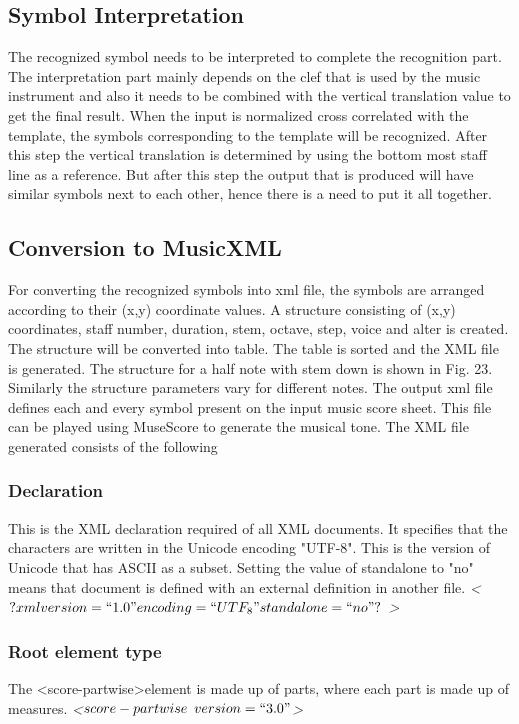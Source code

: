 \documentclass[journal]{IEEEtran}
\begin{document}
\subsection{Symbol Interpretation}
The recognized symbol needs to be interpreted to complete the recognition part. The interpretation part mainly depends on the clef that is used by the music instrument and also it needs to be combined with the vertical translation value to get the final result. When the input is normalized cross correlated with the template, the symbols corresponding to the template will be recognized. After
this step the vertical translation is determined by using the bottom most staff line as a reference. But after this step the output that is produced will have similar symbols next to each other, hence there is a need to put it all together.	



\subsection{Conversion to MusicXML}
For converting the recognized symbols into xml file, the symbols are arranged according to their (x,y) coordinate values. A structure consisting of (x,y) coordinates, staff number, duration, stem, octave, step, voice and alter is created. The structure will be converted into table. The table is sorted and the XML file is generated. The structure for a half note with stem down is shown in Fig. 23. Similarly the structure parameters vary for different notes. The output xml file defines each and every symbol present on the input music score sheet. This file can be played using MuseScore to generate the musical tone. 
The XML file generated consists of the following
\subsubsection{Declaration}

This is the XML declaration required of all XML documents. It specifies that the characters are
written in the Unicode encoding "UTF-8". This is the version of Unicode that has ASCII as a subset.
Setting the value of standalone to "no" means that document is defined with an external definition
in another file.\newline
\textit{ \textless $? xml version=``1.0" encoding=``UTF_8" standalone=``no"? $ \textgreater }

\subsubsection{Root element type}
The \textless score-partwise\textgreater element is made up of parts, where each
part is made up of measures.\newline
\textit{ \textless$score-partwise \enspace version = ``3.0"$\textgreater }  
\end{document}
